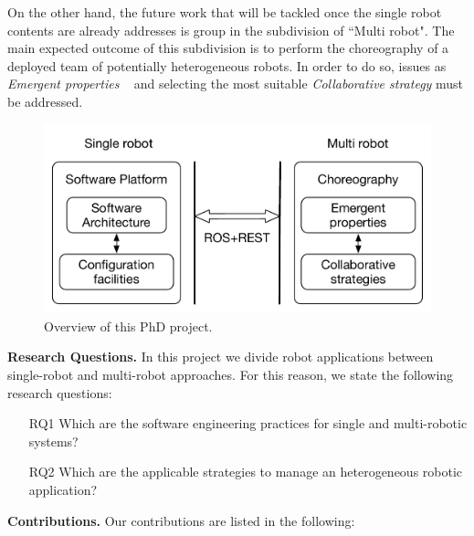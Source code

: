 On the other hand, the future work that will be tackled once the single robot contents are already addresses is group in the subdivision of ``Multi robot".
The main expected outcome of this subdivision is to perform the choreography of a deployed team of potentially heterogeneous robots.
In order to do so, issues as \emph{Emergent properties} ~\cite{DeAngelis2015,DeAngelis2016} and selecting the most suitable \emph{Collaborative strategy}  must be addressed.

\begin{figure}[!t]
\begin{center}
\includegraphics[width=1\linewidth]{Figures/research.pdf}
\caption{Overview of this PhD project.}
\label{fig:overview}
\end{center}
\end{figure}

\textbf{Research Questions.} 
In this project we divide robot applications between single-robot and multi-robot approaches.
For this reason, we state the following research questions:
\begin{itemize}
\item[RQ1] Which are the software engineering practices for single and multi-robotic systems? 
\item[RQ2] Which are the applicable strategies to manage an heterogeneous robotic application?
\end{itemize}

\textbf{Contributions.} 
Our contributions are listed in the following:

